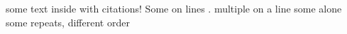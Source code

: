 \documentclass{article}
\begin{document}
some text inside \cite{arxiv:2206.06921} with citations!
Some on lines \cite{arxiv:2104.06997}.
multiple on a line \cite{zbl:07573915} \cite{zbl:0396.46035}
some alone
\cite{zbl:0929.28007}
some repeats, different order \cite{zbl:0396.46035} \cite{zbl:07573915}
\printbibliography
\end{document}
